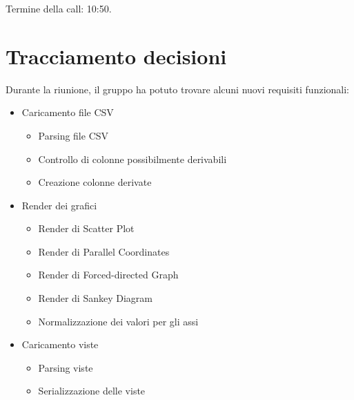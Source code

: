 \noindent Termine della call: 10:50.

\section{Tracciamento decisioni}


\noindent Durante la riunione, il gruppo ha potuto trovare alcuni nuovi requisiti funzionali: 
\begin{itemize}
	\item Caricamento file CSV
	\begin{itemize}
		\item Parsing file CSV
		\item Controllo di colonne possibilmente derivabili
		\item Creazione colonne derivate
	\end{itemize}
	\item Render dei grafici
	\begin{itemize}
		\item Render di Scatter Plot
		\item Render di Parallel Coordinates
		\item Render di Forced-directed Graph
		\item Render di Sankey Diagram
		\item Normalizzazione dei valori per gli assi
	\end{itemize}
	\item Caricamento viste
	\begin{itemize}
		\item Parsing viste
		\item Serializzazione delle viste
	\end{itemize}
\end{itemize}
